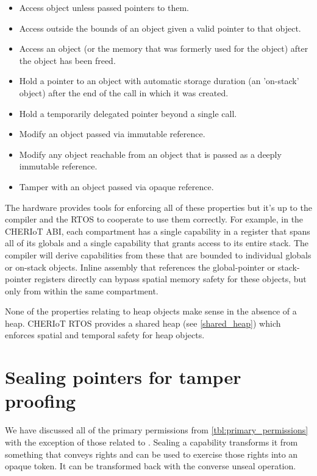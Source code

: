 \begin{itemize}
	\item{Access object unless passed pointers to them.}
	\item{Access outside the bounds of an object given a valid pointer to that object.}
	\item{Access an object (or the memory that was formerly used for the object) after the object has been freed.}
	\item{Hold a pointer to an object with automatic storage duration (an 'on-stack' object) after the end of the call in which it was created.}
	\item{Hold a temporarily delegated pointer beyond a single call.}
	\item{Modify an object passed via immutable reference.}
	\item{Modify any object reachable from an object that is passed as a deeply immutable reference.}
	\item{Tamper with an object passed via opaque reference.}
\end{itemize}

The hardware provides tools for enforcing all of these properties but it's up to the compiler and the RTOS to cooperate to use them correctly.
For example, in the CHERIoT ABI, each compartment has a single capability in a register that spans all of its globals and a single capability that grants access to its entire stack.
The compiler will derive capabilities from these that are bounded to individual globals or on-stack objects.
Inline assembly that references the global-pointer or stack-pointer registers directly can bypass spatial memory safety for these objects, but only from within the same compartment.

None of the properties relating to heap objects make sense in the absence of a heap.
CHERIoT RTOS provides a shared heap (see \ref{shared_heap}) which enforces spatial and temporal safety for heap objects.

\section[label=sealing_intro]{Sealing pointers for tamper proofing}

We have discussed all of the primary permissions from \ref{tbl:primary_permissions} with the exception of those related to .
Sealing a capability transforms it from something that conveys rights and can be used to exercise those rights into an opaque token.
It can be transformed back with the converse unseal operation.


